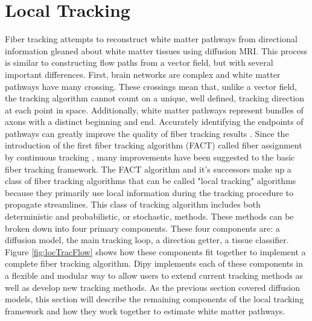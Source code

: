 \section{Local Tracking}
    Fiber tracking attempts to reconstruct white matter pathways from directional information gleaned about white matter tissues using diffusion MRI. This process is similar to constructing flow paths from a vector field, but with several important differences. First, brain networks are complex and white matter pathways have many crossing. These crossings mean that, unlike a vector field, the tracking algorithm cannot count on a unique, well defined, tracking direction at each point in space. Additionally, white matter pathways represent bundles of axons with a distinct beginning and end. Accurately identifying the endpoints of pathways can greatly improve the quality of fiber tracking results \cite{Smith_2012}. Since the introduction of the first fiber tracking algorithm (FACT) called fiber assignment by continuous tracking \cite{Mori_1999}, many improvements have been suggested to the basic fiber tracking framework. The FACT algorithm and it's successors make up a class of fiber tracking algorithms that can be called "local tracking" algorithms because they primarily use local information during the tracking procedure to propagate streamlines. This class of tracking algorithm includes both deterministic and probabilistic, or stochastic, methods. These methods can be broken down into four primary components. These four components are: a diffusion model, the main tracking loop, a direction getter, a tissue classifier. Figure \ref{fig:locTracFlow} shows how these components fit together to implement a complete fiber tracking algorithm. Dipy implements each of these components in a flexible and modular way to allow users to extend current tracking methods as well as develop new tracking methods. As the previous section covered diffusion models, this section will describe the remaining components of the local tracking framework and how they work together to estimate white matter pathways.

